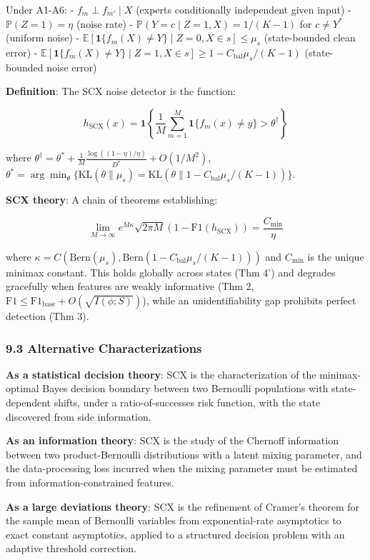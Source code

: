 \documentclass[
  12pt,
]{ctexart}
\begin{document}
Under A1-A6: - \(f_m \perp f_{m'} \mid X\) (experts conditionally
independent given input) - \(\mathbb{P}(Z=1) = \eta\) (noise rate) -
\(\mathbb{P}(Y = c \mid Z=1, X) = 1/(K-1)\) for \(c \neq Y^*\) (uniform
noise) -
\(\mathbb{E}[\mathbf{1}\{f_m(X) \neq Y\} \mid Z=0, X \in s] \leq \mu_s\)
(state-bounded clean error) -
\(\mathbb{E}[\mathbf{1}\{f_m(X) \neq Y\} \mid Z=1, X \in s] \geq 1 - C_{\text{bal}}\mu_s/(K-1)\)
(state-bounded noise error)

\textbf{Definition}: The SCX noise detector is the function:

\[h_{\text{SCX}}(x) = \mathbf{1}\left\{\frac{1}{M}\sum_{m=1}^M \mathbf{1}\{f_m(x) \neq y\} > \theta^\dagger\right\}\]

where
\(\theta^\dagger = \theta^* + \frac{1}{M}\frac{\log((1-\eta)/\eta)}{D^*} + O(1/M^2)\),
\(\theta^* = \arg\min_\theta \{\text{KL}(\theta\|\mu_s) = \text{KL}(\theta\|1 - C_{\text{bal}}\mu_s/(K-1))\}\).

\textbf{SCX theory}: A chain of theorems establishing:

\[\lim_{M\to\infty} e^{M\kappa}\sqrt{2\pi M}(1 - \text{F1}(h_{\text{SCX}})) = \frac{C_{\min}}{\eta}\]

where
\(\kappa = C(\text{Bern}(\mu_s), \text{Bern}(1 - C_{\text{bal}}\mu_s/(K-1)))\)
and \(C_{\min}\) is the unique minimax constant. This holds globally
across states (Thm 4') and degrades gracefully when features are weakly
informative (Thm 2,
\(\text{F1} \leq \text{F1}_{\text{base}} + O(\sqrt{I(\phi;S)})\)), while
an unidentifiability gap prohibits perfect detection (Thm 3).

\subsubsection{9.3 Alternative
Characterizations}\label{alternative-characterizations}

\textbf{As a statistical decision theory}: SCX is the characterization
of the minimax-optimal Bayes decision boundary between two Bernoulli
populations with state-dependent shifts, under a ratio-of-successes risk
function, with the state discovered from side information.

\textbf{As an information theory}: SCX is the study of the Chernoff
information between two product-Bernoulli distributions with a latent
mixing parameter, and the data-processing loss incurred when the mixing
parameter must be estimated from information-constrained features.

\textbf{As a large deviations theory}: SCX is the refinement of Cramer's
theorem for the sample mean of Bernoulli variables from exponential-rate
asymptotics to exact constant asymptotics, applied to a structured
decision problem with an adaptive threshold correction.
\end{document}
